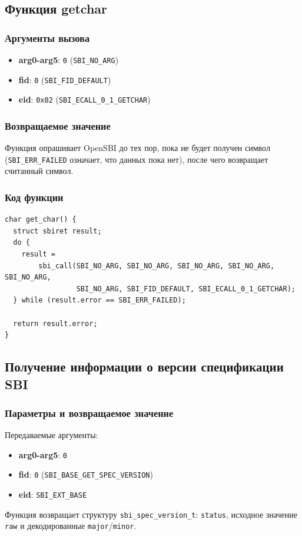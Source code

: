 \documentclass[12pt,a4paper]{report}
\begin{document}
\subsection*{Функция getchar}
\subsubsection*{Аргументы вызова}
\begin{itemize}
    \item \textbf{arg0-arg5}: \texttt{0} (\texttt{SBI\_NO\_ARG})
    \item \textbf{fid}: \texttt{0} (\texttt{SBI\_FID\_DEFAULT})
    \item \textbf{eid}: \texttt{0x02} (\texttt{SBI\_ECALL\_0\_1\_GETCHAR})
\end{itemize}
\subsubsection*{Возвращаемое значение}
Функция опрашивает OpenSBI до тех пор, пока не будет получен символ
(\texttt{SBI\_ERR\_FAILED} означает, что данных пока нет), после чего
возвращает считанный символ.
\subsubsection*{Код функции}
\begin{verbatim}
char get_char() {
  struct sbiret result;
  do {
    result =
        sbi_call(SBI_NO_ARG, SBI_NO_ARG, SBI_NO_ARG, SBI_NO_ARG, SBI_NO_ARG,
                 SBI_NO_ARG, SBI_FID_DEFAULT, SBI_ECALL_0_1_GETCHAR);
  } while (result.error == SBI_ERR_FAILED);

  return result.error;
}
\end{verbatim}

\subsection*{Получение информации о версии спецификации SBI}
\subsubsection*{Параметры и возвращаемое значение}
Передаваемые аргументы:
\begin{itemize}
    \item \textbf{arg0-arg5}: \texttt{0}
    \item \textbf{fid}: \texttt{0} (\texttt{SBI\_BASE\_GET\_SPEC\_VERSION})
    \item \textbf{eid}: \texttt{SBI\_EXT\_BASE}
\end{itemize}
Функция возвращает структуру \texttt{sbi\_spec\_version\_t}:
\texttt{status}, исходное значение \texttt{raw} и декодированные
\texttt{major}/\texttt{minor}.
\end{document}
